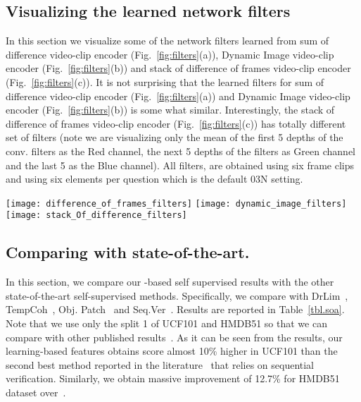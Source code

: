 \subsection{Visualizing the learned network filters}
In this section we visualize some of the network filters learned from sum of difference video-clip encoder (Fig.~\ref{fig:filters}(a)), Dynamic Image video-clip encoder (Fig.~\ref{fig:filters}(b)) and stack of difference of frames video-clip encoder (Fig.~\ref{fig:filters}(c)). It is not surprising that the learned filters for sum of difference video-clip encoder (Fig.~\ref{fig:filters}(a)) and Dynamic Image video-clip encoder (Fig.~\ref{fig:filters}(b)) is some what similar. Interestingly, the stack of difference of frames video-clip encoder (Fig.~\ref{fig:filters}(c)) has totally different set of filters (note we are visualizing only the mean of the first 5 depths of the conv. filters as the Red channel, the next 5 depths of the filters as Green channel and the last 5 as the Blue channel). All filters, are obtained using six frame clips and using six elements per question which is the default 03N setting.
\begin{figure*}[t]
  \centering
  \texttt{[image: difference\_of\_frames\_filters]}  
  \texttt{[image: dynamic\_image\_filters]} 
  \texttt{[image: stack\_Of\_difference\_filters]}
  \caption{Visualizing the learned first convolutional filter weights for (a) sum of difference video-clip encoder (b) Dynamic Image video-clip encoder (c) Stack of difference video-clip encoder.}
  \label{fig:filters}
\end{figure*}
\subsection{Comparing with state-of-the-art.}
\label{sec.soa}
In this section, we compare our -based self supervised results with the other state-of-the-art self-supervised methods. Specifically, we compare with DrLim~\cite{Hadsell2006}, TempCoh~\cite{Mobahi2009}, Obj. Patch~\cite{Wang2015} and Seq.Ver~\cite{Misra2016}. 
Results are reported in Table~\ref{tbl.soa}. Note that we use only the split 1 of UCF101 and HMDB51 so that we can compare with other published results~\cite{Misra2016}.
As it can be seen from the results, our  learning-based features obtains score almost 10\% higher in UCF101 than the second best method reported in the literature~\cite{Misra2016} that relies on sequential verification. Similarly, we obtain massive improvement of 12.7\% for HMDB51 dataset over~\cite{Misra2016}.

